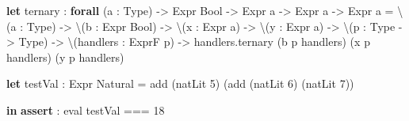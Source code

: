 \documentclass[]{article}
\newenvironment{Shaded}{}{}
\newcommand{\CommentTok}[1]{\textcolor[rgb]{0.38,0.63,0.69}{\textit{#1}}}
\newcommand{\DecValTok}[1]{\textcolor[rgb]{0.25,0.63,0.44}{#1}}
\newcommand{\KeywordTok}[1]{\textcolor[rgb]{0.00,0.44,0.13}{\textbf{#1}}}
\newcommand{\NormalTok}[1]{#1}
\newcommand{\OperatorTok}[1]{\textcolor[rgb]{0.40,0.40,0.40}{#1}}
\begin{document}
\begin{Shaded}
\begin{Highlighting}[]
\KeywordTok{let}\CommentTok{ }\NormalTok{ternary}
\CommentTok{    }\NormalTok{:}\CommentTok{ }\KeywordTok{forall}\CommentTok{ }\NormalTok{(a}\CommentTok{ }\NormalTok{:}\CommentTok{ }\NormalTok{Type)}\CommentTok{ }\OperatorTok{{-}\textgreater{}}\CommentTok{ }\NormalTok{Expr}\CommentTok{ }\NormalTok{Bool}\CommentTok{ }\OperatorTok{{-}\textgreater{}}\CommentTok{ }\NormalTok{Expr}\CommentTok{ }\NormalTok{a}\CommentTok{ }\OperatorTok{{-}\textgreater{}}\CommentTok{ }\NormalTok{Expr}\CommentTok{ }\NormalTok{a}\CommentTok{ }\OperatorTok{{-}\textgreater{}}\CommentTok{ }\NormalTok{Expr}\CommentTok{ }\NormalTok{a}
\CommentTok{    }\NormalTok{=}\CommentTok{ }\OperatorTok{\textbackslash{}}\NormalTok{(a}\CommentTok{ }\NormalTok{:}\CommentTok{ }\NormalTok{Type)}\CommentTok{ }\OperatorTok{{-}\textgreater{}}
\CommentTok{      }\OperatorTok{\textbackslash{}}\NormalTok{(b}\CommentTok{ }\NormalTok{:}\CommentTok{ }\NormalTok{Expr}\CommentTok{ }\NormalTok{Bool)}\CommentTok{ }\OperatorTok{{-}\textgreater{}}
\CommentTok{      }\OperatorTok{\textbackslash{}}\NormalTok{(x}\CommentTok{ }\NormalTok{:}\CommentTok{ }\NormalTok{Expr}\CommentTok{ }\NormalTok{a)}\CommentTok{ }\OperatorTok{{-}\textgreater{}}
\CommentTok{      }\OperatorTok{\textbackslash{}}\NormalTok{(y}\CommentTok{ }\NormalTok{:}\CommentTok{ }\NormalTok{Expr}\CommentTok{ }\NormalTok{a)}\CommentTok{ }\OperatorTok{{-}\textgreater{}}
\CommentTok{      }\OperatorTok{\textbackslash{}}\NormalTok{(p}\CommentTok{ }\NormalTok{:}\CommentTok{ }\NormalTok{Type}\CommentTok{ }\OperatorTok{{-}\textgreater{}}\CommentTok{ }\NormalTok{Type)}\CommentTok{ }\OperatorTok{{-}\textgreater{}}
\CommentTok{      }\OperatorTok{\textbackslash{}}\NormalTok{(handlers}\CommentTok{ }\NormalTok{:}\CommentTok{ }\NormalTok{ExprF}\CommentTok{ }\NormalTok{p)}\CommentTok{ }\OperatorTok{{-}\textgreater{}}
\CommentTok{        }\NormalTok{handlers.ternary}\CommentTok{ }\NormalTok{(b}\CommentTok{ }\NormalTok{p}\CommentTok{ }\NormalTok{handlers)}\CommentTok{ }\NormalTok{(x}\CommentTok{ }\NormalTok{p}\CommentTok{ }\NormalTok{handlers)}\CommentTok{ }\NormalTok{(y}\CommentTok{ }\NormalTok{p}\CommentTok{ }\NormalTok{handlers)}

\KeywordTok{let}\CommentTok{ }\NormalTok{testVal}
\CommentTok{    }\NormalTok{:}\CommentTok{ }\NormalTok{Expr}\CommentTok{ }\NormalTok{Natural}
\CommentTok{    }\NormalTok{=}\CommentTok{ }\NormalTok{add}\CommentTok{ }\NormalTok{(natLit}\CommentTok{ }\DecValTok{5}\NormalTok{)}\CommentTok{ }\NormalTok{(add}\CommentTok{ }\NormalTok{(natLit}\CommentTok{ }\DecValTok{6}\NormalTok{)}\CommentTok{ }\NormalTok{(natLit}\CommentTok{ }\DecValTok{7}\NormalTok{))}

\KeywordTok{in}\CommentTok{  }\KeywordTok{assert}\CommentTok{ }\NormalTok{:}\CommentTok{ }\NormalTok{eval}\CommentTok{ }\NormalTok{testVal}\CommentTok{ }\OperatorTok{===}\CommentTok{ }\DecValTok{18}
\end{Highlighting}
\end{Shaded}
\end{document}
